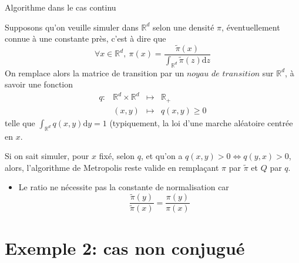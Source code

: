 \documentclass[9pt,ignorenonframetext,]{beamer}
\providecommand{\tightlist}{%
  \setlength{\itemsep}{0pt}\setlength{\parskip}{0pt}}
\newcommand{\rmd}{\text{d}}
\newcommand{\R}{\mathbb{R}}
\begin{document}
\begin{frame}{Algorithme dans le cas continu}
\protect\hypertarget{algorithme-dans-le-cas-continu}{}

Supposons qu'on veuille simuler dans \(\R^d\) selon une densité \(\pi\),
éventuellement connue à une constante près, c'est à dire que
\[\forall x \in \R^d,~\pi(x) = \frac{\tilde{\pi}(x)}{\int_{\R^d}\tilde{\pi}(z)\rmd z}\]
On remplace alors la matrice de transition par un
\(\textit{noyau de transition}\) sur \(\R^d\), à savoir une fonction
\begin{equation*}
\begin{array}{lccc}
q:& \R^d\times \R^d &\mapsto& \R_+\\
& (x, y) & \mapsto & q(x, y)\geq 0
\end{array}
\end{equation*} telle que \(\int_{\R^d}q(x, y)\rmd y = 1\) (typiquement,
la loi d'une marche aléatoire centrée en \(x\).\pause

Si on sait simuler, pour \(x\) fixé, selon \(q\), et qu'on a
\(q(x, y) > 0 \Leftrightarrow q(y, x) > 0\), alors, l'algorithme de
Metropolis reste valide en remplaçant \(\pi\) par \(\tilde{\pi}\) et
\(Q\) par \(q\). \pause

\begin{itemize}
\tightlist
\item
  Le ratio ne nécessite pas la constante de normalisation car
  \[\frac{\tilde{\pi}(y)}{\tilde{\pi}(x)} = \frac{\pi(y)}{\pi(x)}\]
\end{itemize}

\end{frame}

\hypertarget{exemple-2-cas-non-conjuguuxe9}{%
\section{Exemple 2: cas non
conjugué}\label{exemple-2-cas-non-conjuguuxe9}}
\end{document}
